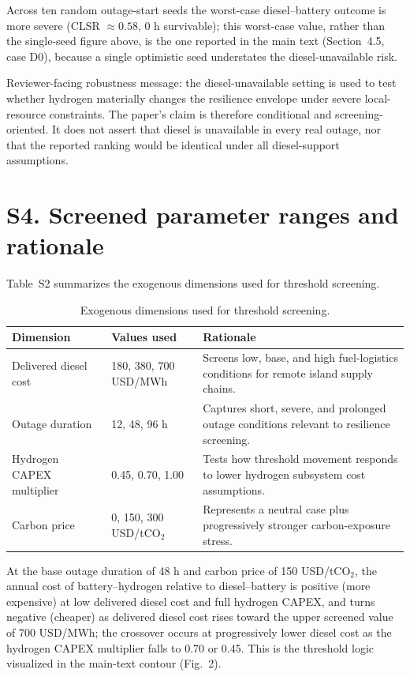 \documentclass[11pt]{article}
\begin{document}
Across ten random outage-start seeds the worst-case diesel--battery outcome is more severe (CLSR $\approx 0.58$, 0 h survivable); this worst-case value, rather than the single-seed figure above, is the one reported in the main text (Section~4.5, case D0), because a single optimistic seed understates the diesel-unavailable risk.

Reviewer-facing robustness message: the diesel-unavailable setting is used to test whether hydrogen materially changes the resilience envelope under severe local-resource constraints. The paper's claim is therefore conditional and screening-oriented. It does not assert that diesel is unavailable in every real outage, nor that the reported ranking would be identical under all diesel-support assumptions.

\section*{S4. Screened parameter ranges and rationale}
Table~S2 summarizes the exogenous dimensions used for threshold screening.

\begin{table}[H]
\centering
\caption{Exogenous dimensions used for threshold screening.}
\label{tab:s2screen}
{\small
\setlength{\tabcolsep}{4pt}
\begin{tabular}{p{2.8cm}p{2.6cm}p{9.2cm}}
\toprule
Dimension & Values used & Rationale \\
\midrule
Delivered diesel cost & 180, 380, 700 USD/MWh & Screens low, base, and high fuel-logistics conditions for remote island supply chains. \\
Outage duration & 12, 48, 96 h & Captures short, severe, and prolonged outage conditions relevant to resilience screening. \\
Hydrogen CAPEX multiplier & 0.45, 0.70, 1.00 & Tests how threshold movement responds to lower hydrogen subsystem cost assumptions. \\
Carbon price & 0, 150, 300 USD/tCO$_2$ & Represents a neutral case plus progressively stronger carbon-exposure stress. \\
\bottomrule
\end{tabular}
}
\end{table}

\begin{sloppypar}
At the base outage duration of 48 h and carbon price of 150 USD/tCO$_2$, the annual cost of battery--hydrogen relative to diesel--battery is positive (more expensive) at low delivered diesel cost and full hydrogen CAPEX, and turns negative (cheaper) as delivered diesel cost rises toward the upper screened value of 700 USD/MWh; the crossover occurs at progressively lower diesel cost as the hydrogen CAPEX multiplier falls to 0.70 or 0.45. This is the threshold logic visualized in the main-text contour (Fig.~2).
\end{sloppypar}
\end{document}
